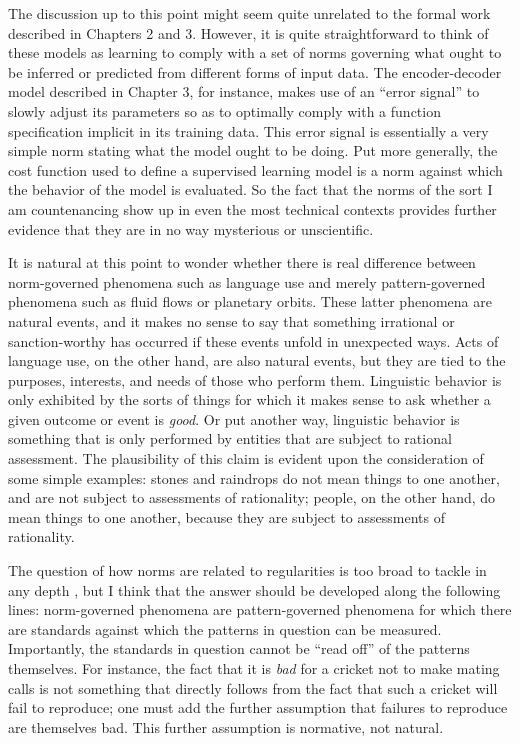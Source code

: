 The discussion up to this point might seem quite unrelated to the formal work described in Chapters 2 and 3. However, it is quite straightforward to think of these models as learning to comply with a set of norms governing what ought to be inferred or predicted from different forms of input data. The encoder-decoder model described in Chapter 3, for instance, makes use of an ``error signal'' to slowly adjust its parameters so as to optimally comply with a function specification implicit in its training data. This error signal is essentially a very simple norm stating what the model ought to be doing. Put more generally, the cost function used to define a supervised learning model is a norm against which the behavior of the model is evaluated. So the fact that the norms of the sort I am countenancing show up in even the most technical contexts provides further evidence that they are in no way mysterious or unscientific. 

It is natural at this point to wonder whether there is real difference between norm-governed phenomena such as language use and merely pattern-governed phenomena such as fluid flows or planetary orbits. These latter phenomena are natural events, and it makes no sense to say that something irrational or sanction-worthy has occurred if these events unfold in unexpected ways. Acts of language use, on the other hand, are also natural events, but they are tied to the purposes, interests, and needs of those who perform them. Linguistic behavior is only exhibited by the sorts of things for which it makes sense to ask whether a given outcome or event is \textit{good}. Or put another way, linguistic behavior is something that is only performed by entities that are subject to rational assessment. The plausibility of this claim is evident upon the consideration of some simple examples: stones and raindrops do not mean things to one another, and are not subject to assessments of rationality; people, on the other hand, do mean things to one another, because they are subject to assessments of rationality. 

The question of how norms are related to regularities is too broad to tackle in any depth \citep[see][]{Brandom:1994,Kripke:1982}, but I think that the answer should be developed along the following lines: norm-governed phenomena are pattern-governed phenomena for which there are standards against which the patterns in question can be measured. Importantly, the standards in question cannot be ``read off'' of the patterns themselves. For instance, the fact that it is \textit{bad} for a cricket not to make mating calls is not something that directly follows from the fact that such a cricket will fail to reproduce; one must add the further assumption that failures to reproduce are themselves bad. This further assumption is normative, not natural.

